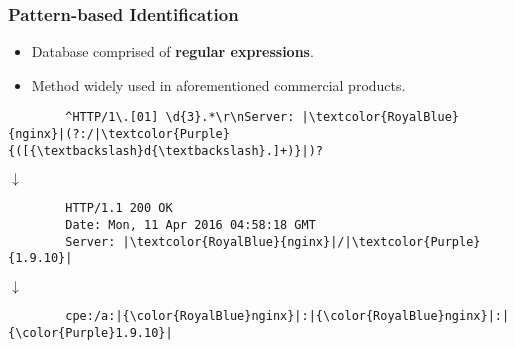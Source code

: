 \documentclass[aspectratio=169,xcolor={usenames,dvipsnames}]{beamer}
\begin{document}
\begin{frame}[fragile]
	\frametitle{Pattern-based Identification}
	
	\begin{itemize}
		\item Database comprised of \textbf{regular expressions}.
		\item Method widely used in aforementioned commercial products.
	\end{itemize}
	
	\vspace{5pt}
	
	\begin{center}
	\begin{minipage}{.8\textwidth}
	\begin{verbatim}
		^HTTP/1\.[01] \d{3}.*\r\nServer: |\textcolor{RoyalBlue}{nginx}|(?:/|\textcolor{Purple}{([{\textbackslash}d{\textbackslash}.]+)}|)?
	\end{verbatim}
	
	\vspace{-7pt}
	\begin{center}
		$\downarrow$
	\end{center}
	\vspace{-7pt}
	
	\begin{verbatim}
		HTTP/1.1 200 OK
		Date: Mon, 11 Apr 2016 04:58:18 GMT
		Server: |\textcolor{RoyalBlue}{nginx}|/|\textcolor{Purple}{1.9.10}|
	\end{verbatim}
	
	\vspace{-7pt}
	\begin{center}
		$\downarrow$
	\end{center}
	\vspace{-7pt}
	
	\begin{verbatim}
		cpe:/a:|{\color{RoyalBlue}nginx}|:|{\color{RoyalBlue}nginx}|:|{\color{Purple}1.9.10}|
	\end{verbatim}
	\end{minipage}
	\end{center}
\end{frame}
\end{document}
